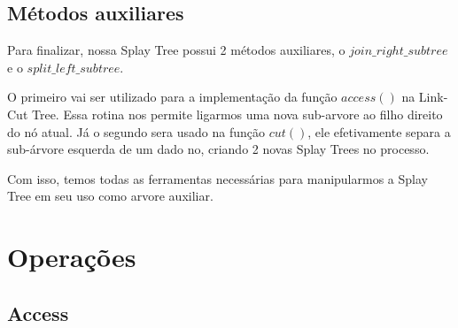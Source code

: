 \subsection{Métodos auxiliares}
\label{subsection:lct-splay-aux}

Para finalizar, nossa Splay Tree possui 2 métodos auxiliares, o $join\_right\_subtree$ e o $split\_left\_subtree$.

O primeiro vai ser utilizado para a implementação da função $access()$ na Link-Cut Tree. Essa rotina nos permite ligarmos uma nova sub-arvore ao filho direito do nó atual. Já o segundo sera usado na função $cut()$, ele efetivamente separa a sub-árvore esquerda de um dado no, criando 2 novas Splay Trees no processo.

Com isso, temos todas as ferramentas necessárias para manipularmos a Splay Tree em seu uso como arvore auxiliar.

\section{Operações}
\label{sec:lct-operacoes}

\subsection{Access}
\label{subsection:lct-access}